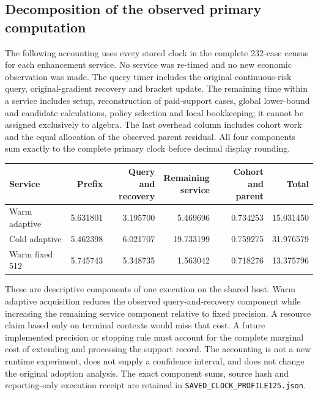 \subsection{Decomposition of the observed primary computation}
\label{dev:clockprofile125}
The following accounting uses every stored clock in the complete 232-case census for each enhancement service. No service was re-timed and no new economic observation was made. The query timer includes the original continuous-risk query, original-gradient recovery and bracket update. The remaining time within a service includes setup, reconstruction of paid-support cases, global lower-bound and candidate calculations, policy selection and local bookkeeping; it cannot be assigned exclusively to algebra. The last overhead column includes cohort work and the equal allocation of the observed parent residual. All four components sum exactly to the complete primary clock before decimal display rounding.
\begin{center}\small
\begin{tabular}{lrrrrr}
\hline
Service & Prefix & \shortstack{Query and\\recovery} & \shortstack{Remaining\\service} & \shortstack{Cohort and\\parent} & Total \\
\hline
Warm adaptive & 5.631801 & 3.195700 & 5.469696 & 0.734253 & 15.031450 \\
Cold adaptive & 5.462398 & 6.021707 & 19.733199 & 0.759275 & 31.976579 \\
Warm fixed 512 & 5.745743 & 5.348735 & 1.563042 & 0.718276 & 13.375796 \\
\hline\end{tabular}
\end{center}
These are descriptive components of one execution on the shared host. Warm adaptive acquisition reduces the observed query-and-recovery component while increasing the remaining service component relative to fixed precision. A resource claim based only on terminal contexts would miss that cost. A future implemented precision or stopping rule must account for the complete marginal cost of extending and processing the support record. The accounting is not a new runtime experiment, does not supply a confidence interval, and does not change the original adoption analysis. The exact component sums, source hash and reporting-only execution receipt are retained in \texttt{SAVED\_CLOCK\_PROFILE125.json}.
